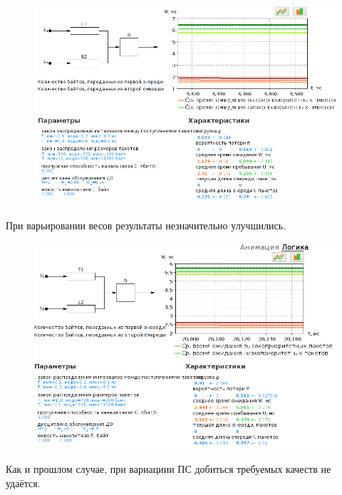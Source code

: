 \documentclass[12pt, a4paper] {ncc}
\begin{document}
		\begin{figure}[h!]
			\includegraphics[scale=0.5]{./img/wfq_5000_7000.png}
		\end{figure}

		При варьировании весов результаты незначительно улучшились. 

		\begin{figure}[h!]
			\includegraphics[scale=0.5]{./img/wfq_5000_7000_w19.png}
		\end{figure}

		Как и прошлом случае, при вариациии ПС добиться требуемых качеств не удаётся. 
\end{document}
